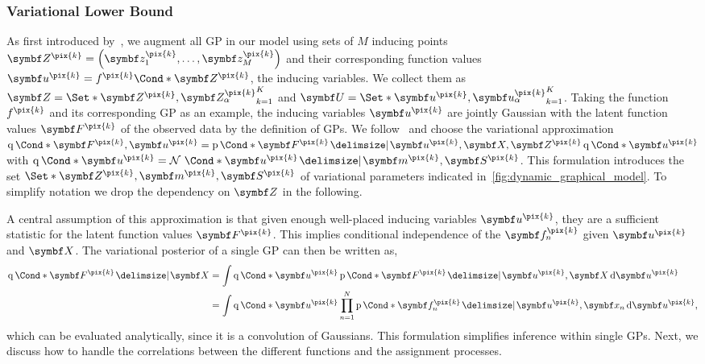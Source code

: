\subsubsection{Variational Lower Bound}
As first introduced by~\textcite{titsias_variational_2009}, we augment all GP in our model using sets of $M$ inducing points $\mat{Z^{\pix{k}}} = \left(\mat{z_1^{\pix{k}}}, \ldots, \mat{z_M^{\pix{k}}}\right)$ and their corresponding function values $\mat{u^{\pix{k}}} = \Fun*{f^{\pix{k}}}{\mat{Z^{\pix{k}}}}$, the inducing variables.
We collect them as $\mat{Z} = \Set*{\mat{Z^{\pix{k}}}, \mat{Z_\alpha^{\pix{k}}}}_{k=1}^K$ and $\mat{U} = \Set*{\mat{u^{\pix{k}}}, \mat{u_\alpha^{\pix{k}}}}_{k=1}^K$.
Taking the function $f^{\pix{k}}$ and its corresponding GP as an example, the inducing variables $\mat{u^{\pix{k}}}$ are jointly Gaussian with the latent function values $\mat{F^{\pix{k}}}$ of the observed data by the definition of GPs.
We follow~\parencite{hensman_gaussian_2013} and choose the variational approximation $\Variat*{\mat{F^{\pix{k}}}, \mat{u^{\pix{k}}}} = \Prob*{\mat{F^{\pix{k}}} \given \mat{u^{\pix{k}}}, \mat{X}, \mat{Z^{\pix{k}}}}\Variat*{\mat{u^{\pix{k}}}}$ with $\Variat*{\mat{u^{\pix{k}}}} = \Gaussian*{\mat{u^{\pix{k}}} \given \mat{m^{\pix{k}}}, \mat{S^{\pix{k}}}}$.
This formulation introduces the set $\Set*{\mat{Z^{\pix{k}}}, \mat{m^{\pix{k}}}, \mat{S^{\pix{k}}}}$ of variational parameters indicated in~\cref{fig:dynamic_graphical_model}.
To simplify notation we drop the dependency on $\mat{Z}$ in the following.

A central assumption of this approximation is that given enough well-placed inducing variables $\mat{u^{\pix{k}}}$, they are a sufficient statistic for the latent function values $\mat{F^{\pix{k}}}$.
This implies conditional independence of the $\mat{f_n^{\pix{k}}}$ given $\mat{u^{\pix{k}}}$ and $\mat{X}$.
The variational posterior of a single GP can then be written as,
\begin{align}
    \begin{split}
        \Variat*{\mat{F^{\pix{k}}} \given \mat{X}}
        &=
        \int \Variat*{\mat{u^{\pix{k}}}}
        \Prob*{\mat{F^{\pix{k}}} \given \mat{u^{\pix{k}}}, \mat{X}}
        \diff \mat{u^{\pix{k}}}
        \\
        &=
        \int \Variat*{\mat{u^{\pix{k}}}}
        \prod_{n=1}^N \Prob*{\mat{f_n^{\pix{k}}} \given \mat{u^{\pix{k}}}, \mat{x_n}}
        \diff \mat{u^{\pix{k}}},
    \end{split}
\end{align}
which can be evaluated analytically, since it is a convolution of Gaussians.
This formulation simplifies inference within single GPs.
Next, we discuss how to handle the correlations between the different functions and the assignment processes.

